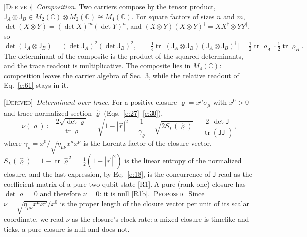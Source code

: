 \documentclass[10pt]{article}
\newcommand{\sJ}{\mathsf{J}}
\newcommand{\tr}{\operatorname{tr}}
\newcommand{\Derived}{\noindent\textsc{[Derived]}\ }
\newcommand{\Proposed}{\noindent\textsc{[Proposed]}\ }
\begin{document}
\smallskip
\Derived \textit{Composition.} Two carriers compose by the tensor product, $\sJ_A\otimes\sJ_B\in M_2(\mathbb C)\otimes M_2(\mathbb C)\cong M_4(\mathbb C)$. For square factors of sizes $n$ and $m$, $\det(X\otimes Y)=(\det X)^m(\det Y)^n$, and $(X\otimes Y)(X\otimes Y)^\dagger=XX^\dagger\otimes YY^\dagger$, so
\begin{equation}
\det(\sJ_A\otimes\sJ_B)=(\det\sJ_A)^2(\det\sJ_B)^2,\qquad \tfrac14\tr\bigl[(\sJ_A\otimes\sJ_B)(\sJ_A\otimes\sJ_B)^\dagger\bigr]=\tfrac12\tr\varrho_A\cdot\tfrac12\tr\varrho_B .\label{e:64}
\end{equation}
The determinant of the composite is the product of the squared determinants, and the trace readout is multiplicative. The composite lies in $M_4(\mathbb C)$: composition leaves the carrier algebra of Sec.~3, while the relative readout of Eq.~\eqref{e:61} stays in it.

\smallskip
\Derived \textit{Determinant over trace.} For a positive closure $\varrho=x^\mu\sigma_\mu$ with $x^0>0$ and trace-normalized section $\widehat\varrho$ (Eqs.~\eqref{e:27}--\eqref{e:30}),
\begin{equation}
\nu(\varrho)\coloneqq\frac{2\sqrt{\det\varrho}}{\tr\varrho}=\sqrt{1-|\vec r|^2}=\frac{1}{\gamma_\varrho}=\sqrt{2S_L(\widehat\varrho)}=\frac{2\,|\det\sJ|}{\tr(\sJ\sJ^\dagger)},\label{e:65}
\end{equation}
where $\gamma_\varrho=x^0/\sqrt{\eta_{\mu\nu}x^\mu x^\nu}$ is the Lorentz factor of the closure vector, $S_L(\widehat\varrho)=1-\tr\widehat\varrho^{\,2}=\frac12(1-|\vec r|^2)$ is the linear entropy of the normalized closure, and the last expression, by Eq.~\eqref{e:18}, is the concurrence of $\sJ$ read as the coefficient matrix of a pure two-qubit state [R1]. A pure (rank-one) closure has $\det\varrho=0$ and therefore $\nu=0$: it is null [R1b]. \Proposed Since $\nu=\sqrt{\eta_{\mu\nu}x^\mu x^\nu}/x^0$ is the proper length of the closure vector per unit of its scalar coordinate, we read $\nu$ as the closure's clock rate: a mixed closure is timelike and ticks, a pure closure is null and does not.
\end{document}
